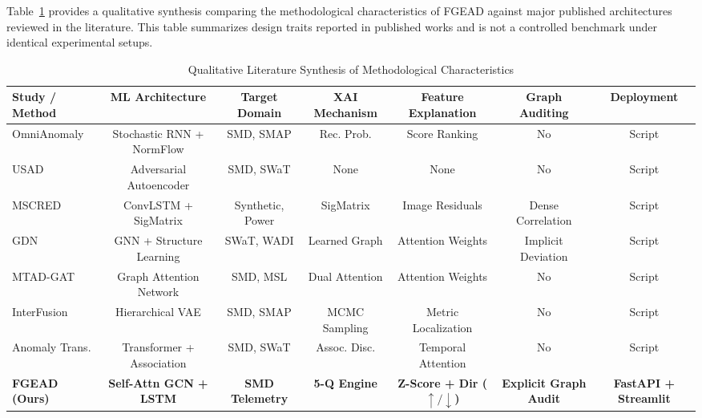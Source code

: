 \documentclass[conference]{IEEEtran}
\begin{document}
Table~\ref{tab:comparison} provides a qualitative synthesis comparing the methodological characteristics of FGEAD against major published architectures reviewed in the literature. This table summarizes design traits reported in published works and is not a controlled benchmark under identical experimental setups.

\begin{table}[t]
\caption{Qualitative Literature Synthesis of Methodological Characteristics}
\label{tab:comparison}
\centering
\begin{tabular}{lcccccc}
\toprule
\textbf{Study / Method} & \textbf{ML Architecture} & \textbf{Target Domain} & \textbf{XAI Mechanism} & \textbf{Feature Explanation} & \textbf{Graph Auditing} & \textbf{Deployment} \\
\midrule
OmniAnomaly \cite{su2019omnianomaly} & Stochastic RNN + NormFlow & SMD, SMAP & Rec. Prob. & Score Ranking & No & Script \\
USAD \cite{audibert2020usad} & Adversarial Autoencoder & SMD, SWaT & None & None & No & Script \\
MSCRED \cite{zhang2019deep} & ConvLSTM + SigMatrix & Synthetic, Power & SigMatrix & Image Residuals & Dense Correlation & Script \\
GDN \cite{deng2021graph} & GNN + Structure Learning & SWaT, WADI & Learned Graph & Attention Weights & Implicit Deviation & Script \\
MTAD-GAT \cite{zhao2020multivariate} & Graph Attention Network & SMD, MSL & Dual Attention & Attention Weights & No & Script \\
InterFusion \cite{li2021multivariate} & Hierarchical VAE & SMD, SMAP & MCMC Sampling & Metric Localization & No & Script \\
Anomaly Trans. \cite{xu2022anomaly} & Transformer + Association & SMD, SWaT & Assoc. Disc. & Temporal Attention & No & Script \\
\textbf{FGEAD (Ours)} & \textbf{Self-Attn GCN + LSTM} & \textbf{SMD Telemetry} & \textbf{5-Q Engine} & \textbf{Z-Score + Dir ($\uparrow/\downarrow$)} & \textbf{Explicit Graph Audit} & \textbf{FastAPI + Streamlit} \\
\bottomrule
\end{tabular}
\end{table}
\end{document}
